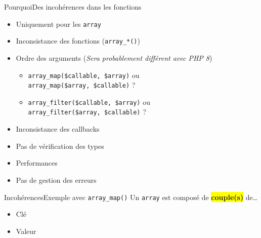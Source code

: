 \begin{frame}{Pourquoi}{Des incohérences dans les fonctions}
    \begin{itemize}[<+->]
        \item Uniquement pour les \texttt{array}
        \item Inconsistance des fonctions (\texttt{array\_*()})
        \item Ordre des arguments (\textit{Sera probablement différent avec PHP 8})
        \begin{itemize}[<+->]
            \item \texttt{array\_map(\$callable, \$array)} ou \\ \texttt{array\_map(\$array, \$callable)} ?
            \item \texttt{array\_filter(\$callable, \$array)} ou \\ \texttt{array\_filter(\$array, \$callable)} ?
        \end{itemize}
        \item Inconsistance des callbacks
        \item Pas de vérification des types
        \item Performances
        \item Pas de gestion des erreurs
    \end{itemize}
\end{frame}

\begin{frame}{Incohérences}{Exemple avec \texttt{array\_map()}}
    Un \texttt{array} est composé de \colorbox{yellow}{\textbf{couple(s)}} de\ldots

    \begin{itemize}[<+->]
        \item<1-> Clé
        \item<2-> Valeur

    \end{itemize}
\end{frame}

